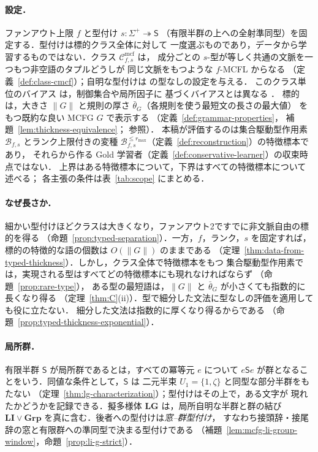 \documentclass[11pt,a4paper]{ltjsarticle}
\numberwithin{equation}{section}
\theoremstyle{plain}
\theoremstyle{definition}
\theoremstyle{remark}
\newcommand{\Cmcf}[2]{\mathcal{C}^{\mathrm{mcf}}_{#1,#2}}
\theoremstyle{plain}
\begin{document}
\paragraph{設定．}
ファンアウト上限 $f$ と型付け $s:\Sigma^+\twoheadrightarrow\mathsf S$
（有限半群の上への全射準同型）を固定する．型付けは標的クラス全体に対して
一度選ぶものであり，データから学習するものではない．クラス $\Cmcf{f}{s}$ は，
成分ごとの $s$-型が等しく共通の文脈を一つもつ非空語のタプルどうしが
同じ文脈をもつような $f$-MCFL からなる
（定義~\ref{def:class-cmcf}）；自明な型付けは \cite{Yoshinaka2011} の型なしの設定を与える．
このクラス単位のバイアス \cite{CosteTyping2004} は，制御集合や局所因子に
基づくバイアスとは異なる
\cite{Takada1988,Takada1995,CosteGaretNicolas2012,CosteNicolas2019}．
標的は，大きさ $\|G\|$ と規則の厚さ $\bar\theta_G$（各規則を使う最短文の長さの最大値）
をもつ既約な良い MCFG $G$ で表示する
（定義~\ref{def:grammar-properties}，
補題~\ref{lem:thickness-equivalence}；\cite{EyraudHeinzYoshinaka2016,kuriyamaCFG} 参照）．
本稿が評価するのは集合駆動型作用素 $\mathcal B_{f,s}$ とランク上限付きの変種
$\mathcal B^{\le r_{\max}}_{f,s}$（定義~\ref{def:reconstruction}）の特徴標本であり，
それらから作る Gold 学習者（定義~\ref{def:conservative-learner}）の収束時点ではない．
上界はある特徴標本について，下界はすべての特徴標本について述べる；
各主張の条件は表~\ref{tab:scope} にまとめる．

\paragraph{なぜ長さか．}
細かい型付けほどクラスは大きくなり，ファンアウト2ですでに非文脈自由の標的を得る
（命題~\ref{prop:typed-separation}）．一方，$f$，ランク，$s$ を固定すれば，
標的の特徴的な語の個数は $O(\|G\|)$ のままである
（定理~\ref{thm:data-from-typed-thickness}）．しかし，クラス全体で特徴標本をもつ
集合駆動型作用素では，実現される型はすべてどの特徴標本にも現れなければならず
（命題~\ref{prop:rare-type}），
ある型の最短語は，$\|G\|$ と $\bar\theta_G$ が小さくても指数的に長くなり得る
（定理~\ref{thm:C}(ii)）．型で細分した文法に型なしの評価を適用しても役に立たない．
細分した文法は指数的に厚くなり得るからである
（命題~\ref{prop:typed-thickness-exponential}）．

\paragraph{局所群．}
有限半群 $\mathsf S$ が局所群であるとは，すべての冪等元 $e$ について
$e\mathsf Se$ が群となることをいう．同値な条件として，$\mathsf S$ は
二元半束 $U_1=\{1,\zeta\}$ と同型な部分半群をもたない
（定理~\ref{thm:lg-characterization}）；型付けはその上で，ある文字が
現れたかどうかを記録できる．擬多様体 $\mathbf{LG}$ は，局所自明な半群と群の結び
$\mathbf{LI}\vee\mathbf{Grp}$ を真に含む．後者への型付けは\emph{窓--群型付け}，
すなわち接頭辞・接尾辞の窓と有限群への準同型で決まる型付けである
（補題~\ref{lem:mcfg-li-group-window}，命題~\ref{prop:li-g-strict}）．
\end{document}

